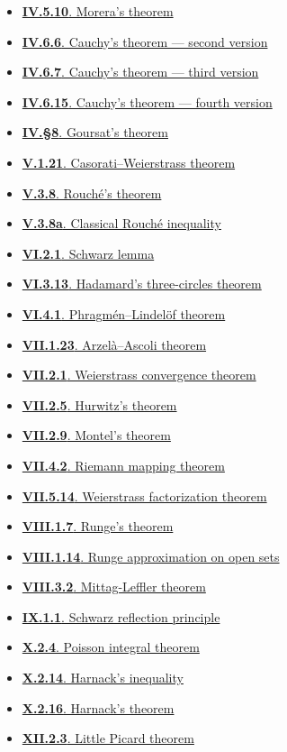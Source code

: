 \documentclass[11pt,a4paper,openany]{book}
\theoremstyle{studyplain}
\theoremstyle{studydefinition}
\theoremstyle{studyremark}
\newcommand{\NamedIndexItem}[3]{%
  \item \hyperref[#1]{\textbf{#2}. #3}%
}
\begin{document}
\begin{multicols}{2}
\begin{itemize}[leftmargin=*,itemsep=0.35em,topsep=0.2em]
\NamedIndexItem{result-iv-5-10-morera-s-theorem}{IV.5.10}{Morera’s theorem}
\NamedIndexItem{result-iv-6-6-cauchy-s-theorem-second-version}{IV.6.6}{Cauchy’s theorem — second version}
\NamedIndexItem{result-iv-6-7-cauchy-s-theorem-third-version}{IV.6.7}{Cauchy’s theorem — third version}
\NamedIndexItem{result-iv-6-15-cauchy-s-theorem-fourth-version}{IV.6.15}{Cauchy’s theorem — fourth version}
\NamedIndexItem{result-iv-8-goursat-s-theorem}{IV.§8}{Goursat’s theorem}
\NamedIndexItem{result-v-1-21-casorati-weierstrass-theorem}{V.1.21}{Casorati–Weierstrass theorem}
\NamedIndexItem{result-v-3-8-rouch-s-theorem}{V.3.8}{Rouché’s theorem}
\NamedIndexItem{result-v-3-8a-classical-rouch-inequality}{V.3.8a}{Classical Rouché inequality}
\NamedIndexItem{result-vi-2-1-schwarz-lemma}{VI.2.1}{Schwarz lemma}
\NamedIndexItem{result-vi-3-13-hadamard-s-three-circles-theorem}{VI.3.13}{Hadamard’s three-circles theorem}
\NamedIndexItem{result-vi-4-1-phragm-n-lindel-f-theorem}{VI.4.1}{Phragmén–Lindelöf theorem}
\NamedIndexItem{result-vii-1-23-arzel-ascoli-theorem}{VII.1.23}{Arzelà–Ascoli theorem}
\NamedIndexItem{result-vii-2-1-weierstrass-convergence-theorem}{VII.2.1}{Weierstrass convergence theorem}
\NamedIndexItem{result-vii-2-5-hurwitz-s-theorem}{VII.2.5}{Hurwitz’s theorem}
\NamedIndexItem{result-vii-2-9-montel-s-theorem}{VII.2.9}{Montel’s theorem}
\NamedIndexItem{result-vii-4-2-riemann-mapping-theorem}{VII.4.2}{Riemann mapping theorem}
\NamedIndexItem{result-vii-5-14-weierstrass-factorization-theorem}{VII.5.14}{Weierstrass factorization theorem}
\NamedIndexItem{result-viii-1-7-runge-s-theorem}{VIII.1.7}{Runge’s theorem}
\NamedIndexItem{result-viii-1-14-runge-approximation-on-open-sets}{VIII.1.14}{Runge approximation on open sets}
\NamedIndexItem{result-viii-3-2-mittag-leffler-theorem}{VIII.3.2}{Mittag-Leffler theorem}
\NamedIndexItem{result-ix-1-1-schwarz-reflection-principle}{IX.1.1}{Schwarz reflection principle}
\NamedIndexItem{result-x-2-4-poisson-integral-theorem}{X.2.4}{Poisson integral theorem}
\NamedIndexItem{result-x-2-14-harnack-s-inequality}{X.2.14}{Harnack’s inequality}
\NamedIndexItem{result-x-2-16-harnack-s-theorem}{X.2.16}{Harnack’s theorem}
\NamedIndexItem{result-xii-2-3-little-picard-theorem}{XII.2.3}{Little Picard theorem}
\end{itemize}
\end{multicols}
\end{document}
